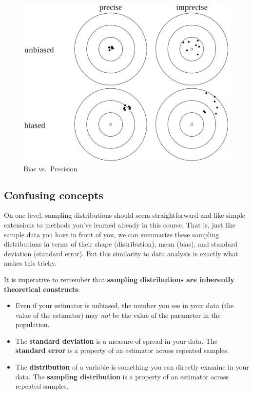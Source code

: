 \documentclass[
  letterpaper,
  DIV=11,
  numbers=noendperiod]{scrreprt}
\providecommand{\tightlist}{%
  \setlength{\itemsep}{0pt}\setlength{\parskip}{0pt}}\usepackage{longtable,booktabs,array}
\theoremstyle{definition}
\theoremstyle{remark}
\begin{document}
\begin{figure}

{\centering \includegraphics{images/bias-precision.png}

}

\caption{\label{fig-bias-precision}Bias vs.~Precision}

\end{figure}

\hypertarget{sec-conf}{%
\subsection{Confusing concepts}\label{sec-conf}}

On one level, sampling distributions should seem straightforward and
like simple extensions to methods you've learned already in this course.
That is, just like sample data you have in front of you, we can
summarize these sampling distributions in terms of their shape
(distribution), mean (bias), and standard deviation (standard error).
But this similarity to data analysis is exactly what makes this tricky.

It is imperative to remember that \textbf{sampling distributions are
inherently theoretical constructs}:

\begin{itemize}
\tightlist
\item
  Even if your estimator is unbiased, the number you see in your data
  (the value of the estimator) may \emph{not} be the value of the
  parameter in the population.
\item
  The \textbf{standard deviation} is a measure of spread in your data.
  The \textbf{standard error} is a property of an estimator across
  repeated samples.
\item
  The \textbf{distribution} of a variable is something you can directly
  examine in your data. The \textbf{sampling distribution} is a property
  of an estimator across repeated samples.
\end{itemize}
\end{document}

